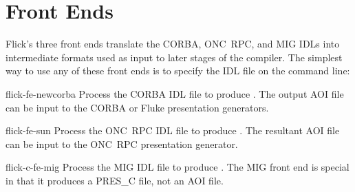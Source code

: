 

\section{Front Ends}
\label{sec:Front Ends}

Flick's three front ends translate the CORBA, ONC~RPC, and MIG IDLs into
intermediate formats used as input to later stages of the compiler.  The
simplest way to use any of these front ends is to specify the IDL file on the
command line:

\begin{commandlist}
  \item[flick-fe-newcorba \commandarg{foo.idl}] Process the CORBA IDL file
   to produce .  The output AOI file
  can be input to the CORBA or Fluke presentation generators.

  \item[flick-fe-sun \commandarg{foo.x}] Process the ONC~RPC IDL file
   to produce .  The resultant AOI file
  can be input to the ONC~RPC presentation generator.

  \item[flick-c-fe-mig \commandarg{foo.defs}] Process the MIG IDL file
   to produce .  The MIG front end is
  special in that it produces a PRES\_C file, not an AOI file.
\end{commandlist}

